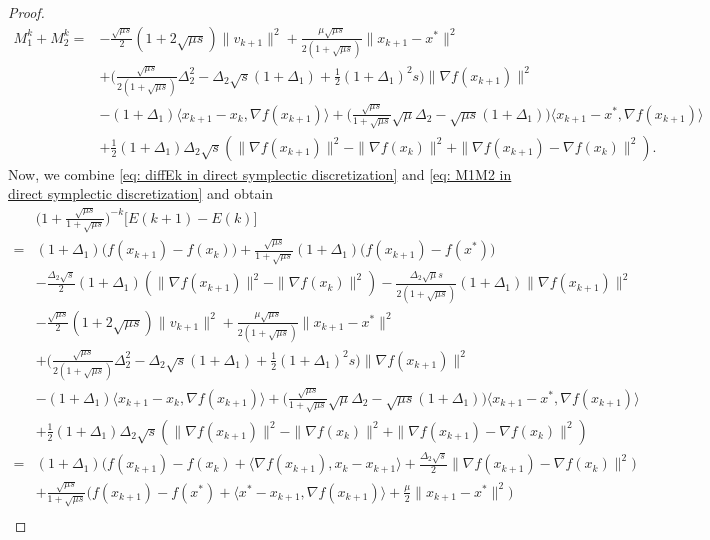 \documentclass[11pt]{article}
\newcommand{\1}{\mathbf 1}
\numberwithin{equation}{section}
\begin{document}
\begin{proof}
\begin{equation}
\begin{aligned}
            M_1^k+M_2^k=&-\frac{\sqrt{\mu s}}{2}(1+2\sqrt{\mu s})\|v_{k+1}\|^2+\frac{\mu \sqrt{\mu s}}{2(1+\sqrt{\mu s})}\|x_{k+1}-x^*\|^2\\
        &+\big(\frac{\sqrt{\mu s}}{2(1+\sqrt{\mu s})}\Delta_2^2-\Delta_2\sqrt{s}(1+\Delta_1)+\frac{1}{2}(1+\Delta_1)^2s\big)\|\nabla f(x_{k+1})\|^2\\
        &-(1+\Delta_1)\langle x_{k+1}-x_k,\nabla f(x_{k+1})\rangle +\big(\frac{\sqrt{\mu s}}{1+\sqrt{\mu s}}\sqrt{\mu}\Delta_2-\sqrt{\mu s}(1+\Delta_1)\big)\langle x_{k+1}-x^*, \nabla f(x_{k+1})\rangle\\
        &+\frac{1}{2}(1+\Delta_1)\Delta_2\sqrt{s}(\|\nabla f(x_{k+1})\|^2-\|\nabla f(x_k)\|^2+\|\nabla f(x_{k+1})-\nabla f(x_k)\|^2).
        \end{aligned}
    \end{equation}
    Now, we combine \eqref{eq: diffEk in direct symplectic discretization} and \eqref{eq: M1M2 in direct symplectic discretization} and obtain
    \begin{align*}
        &\Big(1+\frac{\sqrt{\mu s}}{1+\sqrt{\mu s}}\Big)^{-k}\big[E(k+1)-E(k)\big]\\
        =&(1+\Delta_1)\big(f(x_{k+1})-f(x_k)\big)+\frac{\sqrt{\mu s}}{1+\sqrt{\mu s}}(1+\Delta_1)\big(f(x_{k+1})-f(x^*)\big)\\
        &-\frac{\Delta_2\sqrt{s}}{2}(1+\Delta_1)(\|\nabla f(x_{k+1})\|^2-\|\nabla f(x_k)\|^2)-\frac{\Delta_2\sqrt{\mu}s}{2(1+\sqrt{\mu s})}(1+\Delta_1)\|\nabla f(x_{k+1})\|^2\\
        &-\frac{\sqrt{\mu s}}{2}(1+2\sqrt{\mu s})\|v_{k+1}\|^2+\frac{\mu \sqrt{\mu s}}{2(1+\sqrt{\mu s})}\|x_{k+1}-x^*\|^2\\
        &+\big(\frac{\sqrt{\mu s}}{2(1+\sqrt{\mu s})}\Delta_2^2-\Delta_2\sqrt{s}(1+\Delta_1)+\frac{1}{2}(1+\Delta_1)^2s\big)\|\nabla f(x_{k+1})\|^2\\
        &-(1+\Delta_1)\langle x_{k+1}-x_k,\nabla f(x_{k+1})\rangle +\big(\frac{\sqrt{\mu s}}{1+\sqrt{\mu s}}\sqrt{\mu}\Delta_2-\sqrt{\mu s}(1+\Delta_1)\big)\langle x_{k+1}-x^*, \nabla f(x_{k+1})\rangle\\
        &+\frac{1}{2}(1+\Delta_1)\Delta_2\sqrt{s}(\|\nabla f(x_{k+1})\|^2-\|\nabla f(x_k)\|^2+\|\nabla f(x_{k+1})-\nabla f(x_k)\|^2)\\
        =&(1+\Delta_1)\big(f(x_{k+1})-f(x_k)+\langle \nabla f(x_{k+1}), x_k-x_{k+1} \rangle + \frac{\Delta_2\sqrt{s}}{2}\|\nabla f(x_{k+1})-\nabla f(x_k)\|^2\big)\\
        &+\frac{\sqrt{\mu s}}{1+\sqrt{\mu s}}\big(f(x_{k+1})-f(x^*)+\langle x^*-x_{k+1},\nabla f(x_{k+1})\rangle+\frac{\mu}{2}\|x_{k+1}-x^*\|^2 \big)\\

\end{align*}
\end{proof}
\end{document}
